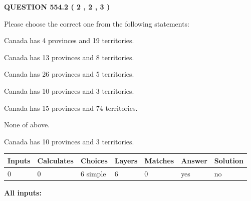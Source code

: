 \documentclass[12pt]{article}
\begin{document}
   
  
\vspace{0.2in}
  
{\textbf{\Large{QUESTION
554.2 
 ( 2 , 2 , 3 )
}}}
  
  
Please choose the correct one from the following statements:
 
 
Canada has   4 provinces and  19 territories.
 
 
Canada has  13 provinces and  8 territories.
 
 
Canada has  26 provinces and  5 territories.
 
 
Canada has 10  provinces and 3 territories.
 
 
Canada has  15 provinces and  74 territories.
 
 
 None of above.
 
 
\noindent{}
 
 
Canada has 10  provinces and 3 territories.
 
 
\noindent{}
 
 
   
   
   
   
\noindent\begin{tabular}{|l|l|l|l|l|l|l|}
 \hline
Inputs & Calculates & Choices & Layers & Matches & Answer & Solution \\ \hline
 0  & 
 0  & 
 6
  simple  
  & 
 6  & 
 0  & 
  yes & 
  no 
  \\ \hline
 \end{tabular}
   
   
   
   
\noindent{}
   
   
   
   
\noindent\vspace{0.1in}\hspace{-0.08in} {\textbf{\Large{All inputs: }}}
   
   
   
   
   
   
 \vspace{0.2in}
 
\end{document}
